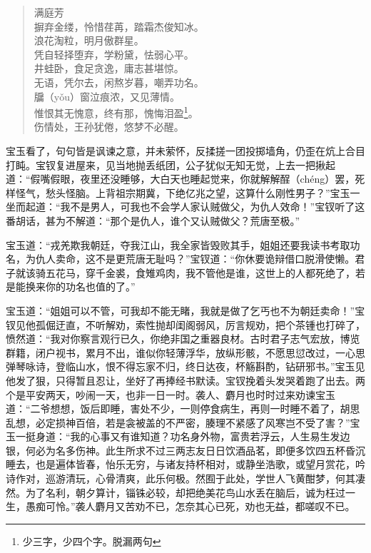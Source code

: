 \documentclass[12pt,oneside]{book}
\newenvironment{shici}{%
\begin{verse}%
\centering\large\hspace{12pt}}%
{\end{verse}}
\begin{document}
\begin{shici}
满庭芳 \\
摒弃金缕，怜惜荏苒，踏霜杰俊知冰。\\
浪花淘粒，明月傲群星。\\
凭自轻择堕弃，学粉黛，怯弱心平。\\
井蛙卧，食足贪逸，庸志甚堪惊。\\
无语，凭尔去，闲熬岁暮，嘲弄功名。\\
牖（yǒu）窗泣痕浓，又见薄情。  \\        
惟恨其无愧意，终有那，愧悔泪盈\footnote{少三字，少四个字。脱漏两句}。\\
伤情处，王孙犹倦，悠梦不必醒。
\end{shici}

宝玉看了，句句皆是讽谏之意，并未萦怀，反揉搓一团投掷墙角，仍歪在炕上合目打盹。宝钗复进屋来，见当地抛丢纸团，公子犹似无知无觉，上去一把揪起道：“假嘴假眼，夜里还没睡够，大白天也睡起觉来，你就解解酲（chéng）罢，死样怪气，愁头怪脑。上背祖宗期冀，下绝亿兆之望，这算什么刚性男子？”宝玉一坐而起道：“我不是男人，可我也不会学人家认贼做父，为仇人效命！”宝钗听了这番胡话，甚为不解道：“那个是仇人，谁个又认贼做父？荒唐至极。”

宝玉道：“戎羌欺我朝廷，夺我江山，我全家皆毁败其手，姐姐还要我读书考取功名，为仇人卖命，这不是更荒唐无耻吗？”宝钗道：“你休要诡辩借口脱滑使懒。君子就该骑五花马，穿千金裘，食雉鸡肉，我不管他是谁，这世上的人都死绝了，若是能换来你的功名也值的了。”

宝玉道：“姐姐可以不管，可我却不能无睹，我就是做了乞丐也不为朝廷卖命！”宝钗见他孤倔迂直，不听解劝，索性抛却闺阁弱风，厉言规劝，把个茶锺也打碎了，愤然道：“我对你察言观行已久，你绝非国之重器良材。古时君子志气宏放，博览群籍，闭户视书，累月不出，谁似你轻薄浮华，放纵形骸，不愿思愆改过，一心思弹琴咏诗，登临山水，恨不得忘家不归，终日达夜，杯觞斟酌，钻研邪书。”宝玉见他发了狠，只得暂且忍让，坐好了再捧经书默读。宝钗挽着头发哭着跑了出去。两个是平安两天，吵闹一天，也非一日一时。袭人、麝月也时时过来劝谏宝玉道：“二爷想想，饭后即睡，害处不少，一则停食病生，再则一时睡不着了，胡思乱想，必定损神百倍，若是衾被盖的不严密，腠理不紧感了风寒岂不受了害？”宝玉一挺身道：“我的心事又有谁知道？功名身外物，富贵若浮云，人生易生发边银，何必为名多伤神。此生所求不过三两志友日日饮酒品茗，即便多饮四五杯昏沉睡去，也是遍体皆春，怡乐无穷，与诸友持杯相对，或静坐浩歌，或望月赏花，吟诗作对，巡游清玩，心骨清爽，此乐何极。然囿于此处，学世人飞黄酣梦，何其凄然。为了名利，朝夕算计，锱铢必较，却把绝美花鸟山水丢在脑后，诚为枉过一生，愚痴可怜。”袭人麝月又苦劝不已，怎奈其心已死，劝也无益，都嗟叹不已。
\end{document}
